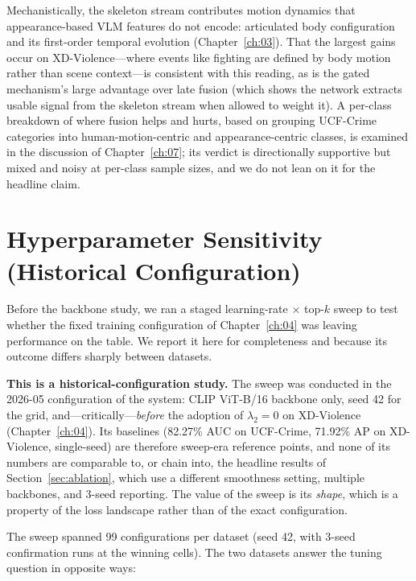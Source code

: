 Mechanistically, the skeleton stream contributes motion dynamics that
appearance-based VLM features do not encode: articulated body configuration
and its first-order temporal evolution (Chapter~\ref{ch:03}). That the largest
gains occur on XD-Violence---where events like fighting are defined by body
motion rather than scene context---is consistent with this reading, as is the
gated mechanism's large advantage over late fusion (which shows the network
extracts usable signal from the skeleton stream when allowed to weight it).
A per-class breakdown of where fusion helps and hurts, based on grouping
UCF-Crime categories into human-motion-centric and appearance-centric classes,
is examined in the discussion of Chapter~\ref{ch:07}; its verdict is
directionally supportive but mixed and noisy at per-class sample sizes, and we
do not lean on it for the headline claim.

\section{Hyperparameter Sensitivity (Historical Configuration)}
\label{sec:sweep}

Before the backbone study, we ran a staged learning-rate $\times$ top-$k$
sweep to test whether the fixed training configuration of
Chapter~\ref{ch:04} was leaving performance on the table. We report it here
for completeness and because its outcome differs sharply between datasets.

\textbf{This is a historical-configuration study.} The sweep was conducted in
the 2026-05 configuration of the system: CLIP ViT-B/16 backbone only, seed 42
for the grid, and---critically---\emph{before} the adoption of $\lambda_2 = 0$
on XD-Violence (Chapter~\ref{ch:04}). Its baselines (82.27\% AUC on UCF-Crime,
71.92\% AP on XD-Violence, single-seed) are therefore sweep-era reference
points, and none of its numbers are comparable to, or chain into, the headline
results of Section~\ref{sec:ablation}, which use a different smoothness
setting, multiple backbones, and 3-seed reporting. The value of the sweep is
its \emph{shape}, which is a property of the loss landscape rather than of the
exact configuration.

The sweep spanned 99 configurations per dataset (seed 42, with 3-seed
confirmation runs at the winning cells). The two datasets answer the tuning
question in opposite ways:

